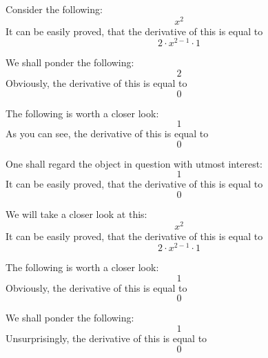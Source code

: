 \documentclass{article}
\begin{document}
Consider the following:
\begin{equation}
x ^{2 } 
\end{equation}
It can be easily proved, that the derivative of this is equal to
\begin{equation}
2 \cdot x ^{2 - 1 } \cdot 1 
\end{equation}

We shall ponder the following:
\begin{equation}
2 
\end{equation}
Obviously, the derivative of this is equal to
\begin{equation}
0 
\end{equation}

The following is worth a closer look:
\begin{equation}
1 
\end{equation}
As you can see, the derivative of this is equal to
\begin{equation}
0 
\end{equation}

One shall regard the object in question with utmost interest:
\begin{equation}
1 
\end{equation}
It can be easily proved, that the derivative of this is equal to
\begin{equation}
0 
\end{equation}

We will take a closer look at this:
\begin{equation}
x ^{2 } 
\end{equation}
It can be easily proved, that the derivative of this is equal to
\begin{equation}
2 \cdot x ^{2 - 1 } \cdot 1 
\end{equation}

The following is worth a closer look:
\begin{equation}
1 
\end{equation}
Obviously, the derivative of this is equal to
\begin{equation}
0 
\end{equation}

We shall ponder the following:
\begin{equation}
1 
\end{equation}
Unsurprisingly, the derivative of this is equal to
\begin{equation}
0 
\end{equation}
\end{document}

